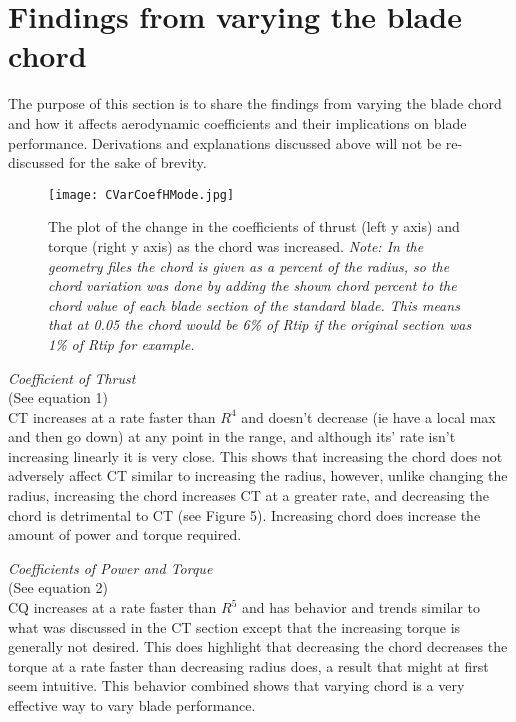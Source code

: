 \documentclass[12pt]{texmemo} %
\begin{document}
\vspace{5mm} %

\section{Findings from varying the blade chord}
The purpose of this section is to share the findings from varying the blade chord and how it affects aerodynamic coefficients and their implications on blade performance. Derivations and explanations discussed above will not be re-discussed for the sake of brevity.

\vspace{5mm} %

\begin{figure}[h]
\centering
\texttt{[image: CVarCoefHMode.jpg]}
\caption{The plot of the change in the coefficients of thrust (left y axis) and torque (right y axis) as the chord was increased. \textit{Note: In the geometry files the chord is given as a percent of the radius, so the chord variation was done by adding the shown chord percent to the chord value of each blade section of the standard blade. This means that at 0.05 the chord would be 6\% of Rtip if the original section was 1\% of Rtip for example.}}
\end{figure}

\textit{Coefficient of Thrust}\\
(See equation 1)\\
CT increases at a rate faster than $R^4$ and doesn't decrease (ie have a local max and then go down) at any point in the range, and although its' rate isn't increasing linearly it is very close. This shows that increasing the chord does not adversely affect CT similar to increasing the radius, however, unlike changing the radius, increasing the chord increases CT at a greater rate, and decreasing the chord is detrimental to CT (see Figure 5). Increasing chord does increase the amount of power and torque required.

\vspace{5mm} %

\textit{Coefficients of Power and Torque}\\ 
(See equation 2)\\
CQ increases at a rate faster than $R^5$ and has behavior and trends similar to what was discussed in the CT section except that the increasing torque is generally not desired. This does highlight that decreasing the chord decreases the torque at a rate faster than decreasing radius does, a result that might at first seem intuitive. This behavior combined shows that varying chord is a very effective way to vary blade performance.
\end{document}
